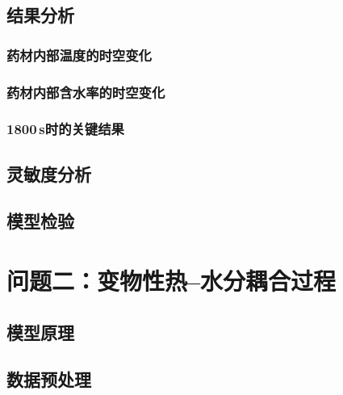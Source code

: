 \documentclass[withoutpreface,bwprint]{cumcmthesis}
\begin{document}

\subsection{结果分析}

\subsubsection{药材内部温度的时空变化}
\subsubsection{药材内部含水率的时空变化}
\subsubsection{1800\,s时的关键结果}

\subsection{灵敏度分析}


\subsection{模型检验}

















 
\section{问题二：变物性热--水分耦合过程}


\subsection{模型原理}


\subsection{数据预处理}
\end{document}
